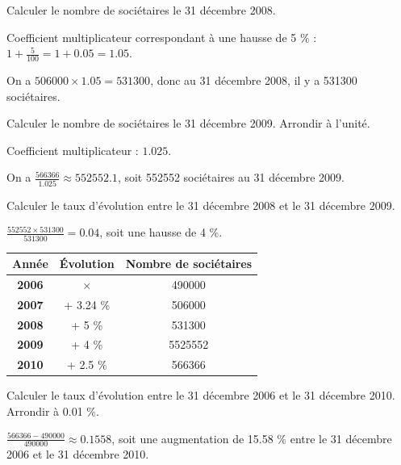 \documentclass[a4paper,11pt]{exam}
\begin{document}
\begin{questions}
	\question Calculer le nombre de sociétaires le 31 décembre 2008.
	\begin{solution}
		Coefficient multiplicateur correspondant  à une hausse de \num{5} \% : $1 + \frac{5}{100}=1+\num{0.05}=\num{1.05}$.
		
		On a $\num{506000} \times \num{1.05} = \num{531300}$, donc au 31 décembre 2008, il y a \num{531300} sociétaires.
	\end{solution}
	
	\question Calculer le nombre de sociétaires le 31 décembre 2009. Arrondir à l'unité.
	\begin{solution}
		Coefficient multiplicateur : $\num{1.025}$.
		
		On a $\frac{\num{566366}}{\num{1.025}}  \approx \num{552552.1}$, soit \num{552552} sociétaires au 31 décembre 2009.
	\end{solution}
	
	\question Calculer le taux d'évolution entre le 31 décembre 2008 et le 31 décembre 2009.
	\begin{solution}
		$\frac{\num{552552} \times \num{531300}}{\num{531300}} = \num{0.04}$, soit une hausse de 4 \%.
		
		\begin{tabular}{|c|c|c|}
			\hline
			\textbf{Année} & \textbf{\'Evolution} & \textbf{Nombre de sociétaires} \\
			\hline
			\textbf{2006} & {\LARGE $\times$} & \num{490000} \\
			\hline
			\textbf{2007} & + \num{3.24} \% & \num{506000}\\
			\hline
			\textbf{2008} & + \num{5} \% & \num{531300}\\
			\hline
			\textbf{2009} & + \num{4} \% & \num{5525552} \\
			\hline
			\textbf{2010} & + \num{2.5} \% & \num{566366} \\
			\hline
			
		\end{tabular}
	\end{solution}
	
	
	\question Calculer le taux d'évolution entre le 31 décembre 2006 et le 31 décembre 2010. Arrondir à \num{0.01} \%.
	\begin{solution}
		$\frac{\num{566366}-\num{490000}}{\num{490000}}\approx \num{0.1558}$, soit une augmentation de \num{15.58} \% entre le 31 décembre 2006 et le 31 décembre 2010.
	\end{solution}
	
	
\end{questions}
\end{document}

